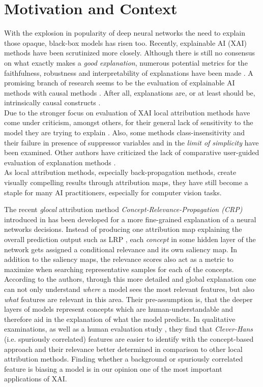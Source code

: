 \section{Motivation and Context}
With the explosion in popularity of deep neural networks the need to explain those opaque, black-box models has risen too. Recently, explainable AI (XAI) methods have been scrutinized more closely. Although there is still no consensus on what exactly makes a \textit{good explanation}, numerous potential metrics for the faithfulness, robustness and interpretability of explanations have been made \cite{Nauta2023}. A promising branch of research seems to be the evaluation of explainable AI methods with causal methods \cite{Moraffah2020a}. After all, explanations are, or at least should be, intrinsically causal constructs \cite{Woodward2004, Halpern2005, Schoelkopf2019}.\\

Due to the stronger focus on evaluation of XAI local attribution methods have come under criticism, amongst others, for their general lack of sensitivity to the model they are trying to explain \cite{Adebayo2018, Karimi2023}. Also, some methods class-insensitivity \cite{Sixt2020} and their failure in presence of suppressor variables \cite{Wilming2023} and in the \textit{limit of simplicity} \cite{Kindermans2017} have been examined. Other authors have criticized the lack of comparative user-guided evaluation of explanation methods \cite{Rong2023}. \\

As local attribution methods, especially back-propagation methods, create visually compelling results through attribution maps, they have still become a staple for many AI practitioners, especially for computer vision tasks. 

The recent \textit{glocal} attribution method \textit{Concept-Relevance-Propagation (CRP)} introduced in \cite{Achtibat2022} has been developed for a more fine-grained explanation of a neural networks decisions. Instead of producing one attribution map explaining the overall prediction output such as LRP \cite{Bach2015}, each \textit{concept} in some hidden layer of the network gets assigned a conditional relevance and its own saliency map. In addition to the saliency maps, the relevance scores also act as a metric to maximize when searching representative samples for each of the concepts. According to the authors, through this more detailed and global explanation one can not only understand \textit{where} a model sees the most relevant features, but also \textit{what} features are relevant in this area. Their pre-assumption is, that the deeper layers of models represent concepts which are human-understandable and therefore aid in the explanation of what the model predicts. In qualitative examinations, as well as a human evaluation study \cite{Achtibat2023}, they find that \textit{Clever-Hans} (i.e. spuriously correlated) features are easier to identify with the concept-based approach and their relevance better determined in comparison to other local attribution methods. Finding whether a background or spuriously correlated feature is biasing a model is in our opinion one of the most important applications of XAI.
\\

